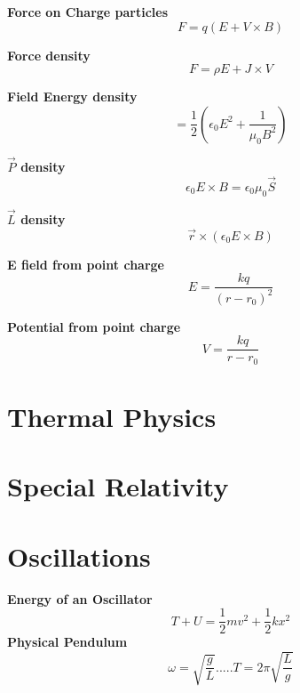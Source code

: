 \documentclass{article}
\begin{document}
{\bf{Force on Charge particles}}\begin{equation}F=q(E+V\times B)\end{equation}

{\bf{Force density}}\begin{equation}F=\rho E + J\times V\end{equation}

{\bf{Field Energy density}}\begin{equation}=\frac{1}{2} (\epsilon_0 E^2 + \frac{1}{\mu_0 B^2})\end{equation}

{\bf{$\vec{P}$ density}} \begin{equation}\epsilon_0 E \times B = \epsilon_0 \mu_0 \vec{S}\end{equation}

{\bf{$\vec{L}$ density}}\begin{equation}\vec{r}\times (\epsilon_0 E \times B)\end{equation}

{\bf{E field from point charge}}\begin{equation}E=\frac{kq}{(r-r_0)^2}\end{equation}

{\bf{Potential from point charge}}\begin{equation}V=\frac{kq}{r-r_0}\end{equation}










\section{Thermal Physics}









\section{Special Relativity}









\section{Oscillations}
{\bf{Energy of an Oscillator}}\begin{equation}T+U=\frac{1}{2}mv^2 + \frac{1}{2}kx^2\end{equation}
{\bf{Physical Pendulum}}\begin{equation}\omega = \sqrt{\frac{g}{L}}.....T=2\pi \sqrt{\frac{L}{g}}\end{equation}
\end{document}

